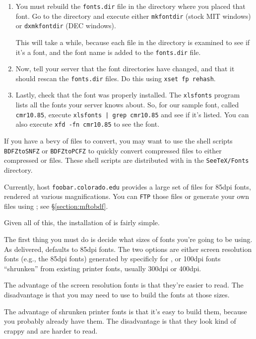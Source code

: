 \begin{enumerate}
\item	You must rebuild the {\tt fonts.dir} file in the directory
	where you placed that font. Go to the directory and execute
	either {\tt mkfontdir} (stock MIT {\X} windows) or
	{\tt dxmkfontdir} (DEC {\X} windows).

	This will take a while, because each file in the directory
	is examined to see if it's a font, and the font name is
	added to the {\tt fonts.dir} file.

\item	Now, tell your server that the font directories have changed,
	and that it should rescan the {\tt fonts.dir} files. Do this
	using \verb|xset fp rehash|.

\item	Lastly, check that the font was properly installed. The
	{\tt xlsfonts} program lists all the fonts your server knows
	about. So, for our sample font, called {\tt cmr10.85},
	execute \verb/xlsfonts | grep cmr10.85/ and see if it's
	listed. You can also execute \verb|xfd -fn cmr10.85| to
	see the font.
\end{enumerate}

If you have a bevy of {\BDF} files to convert, you may want to use the
shell scripts {\tt BDFZtoSNFZ} or {\tt BDFZtoPCFZ} to quickly convert
compressed {\BDF} files to either compressed {\SNF} or {\PCF} files.
These shell scripts are distributed with {\xtex} in the
\verb|SeeTeX/Fonts| directory.


Currently, host \verb|foobar.colorado.edu| provides a large set of
{\BDF} files for 85dpi fonts, rendered at various magnifications.
You can {\tt FTP} those files or generate your own {\BDF} files using
{\mftobdf}; see \S\ref{section:mftobdf}.


Given all of this, the installation of {\xtex} is fairly simple.

The first thing you must do is decide what sizes of fonts you're going
to be using. As delivered, {\xtex} defaults to 85dpi fonts. The two
options are either screen resolution
fonts (e.g., the 85dpi fonts) generated by {\MetaFont}
specificly for {\xtex}, or 100dpi fonts ``shrunken'' from existing
printer fonts, usually 300dpi or 400dpi.

The advantage of the screen resolution fonts is that they're easier
to read. The disadvantage is that you may need to use {\MetaFont} to
build the fonts at those sizes.

The advantage of shrunken printer fonts is that it's easy to build
them, because you probably already have them. The disadvantage is that
they look kind of crappy and are harder to read.

